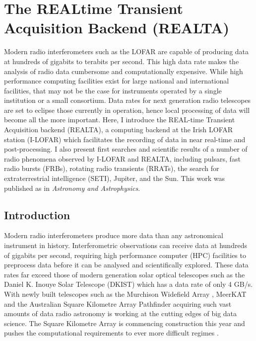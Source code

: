 \doublespacing
\chapter{The REALtime Transient Acquisition Backend (REALTA)}
\label{chap:REALTA}
Modern radio interferometers such as the LOFAR are capable of producing data at hundreds of gigabits to terabits per second. This high data rate makes the analysis of radio data cumbersome and computationally expensive. While high performance computing facilities exist for large national and international facilities, that may not be the case for instruments operated by a single institution or a small consortium. 
Data rates for next generation radio telescopes are set to eclipse those currently in operation, hence local processing of data will become all the more important.
Here, I introduce the REAL-time Transient Acquisition backend (REALTA), a computing backend at the Irish LOFAR station (I-LOFAR) which facilitates the recording of data in near real-time and post-processing. I also present first searches and scientific results of a number of radio phenomena observed by I-LOFAR and REALTA, including pulsars, fast radio bursts (FRBs), rotating radio transients (RRATs), the search for extraterrestrial intelligence (SETI), Jupiter, and the Sun. This work was published as \cite{Murphy2021b} in \textit{Astronomy and Astrophysics}.

\section{Introduction}
\label{sec:realta_intro}
Modern radio interferometers produce more data than any astronomical instrument in history. Interferometric observations can receive data at hundreds of gigabits per second, requiring high performance computer (HPC) facilities to preprocess data before it can be analysed and scientifically explored. These data rates far exceed those of modern generation solar optical telescopes such as the Daniel K. Inouye Solar Telescope (DKIST) which has a data rate of only 4 GB/s. With newly built telescopes such as the Murchison Widefield Array \citep[MWA;][]{Lonsdale2009}, MeerKAT \citep{Jonas2016} and the Australian Square Kilometre Array Pathfinder \citep[ASKAP;][]{Johnston2008} acquiring such vast amounts of data \citep[up to $300$~Gbps;][]{Voronkov2020, Lonsdale2009} radio astronomy is working at the cutting edges of big data science. The Square Kilometre Array \citep{McMullin2020} is commencing construction this year and pushes the computational requirements to ever more difficult regimes \citep{Scaife2020}.

